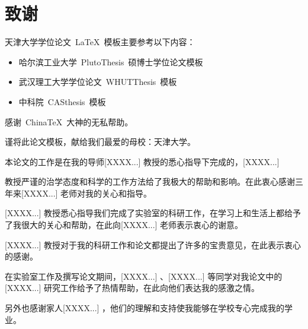 
\chapter*{致\quad 谢}

天津大学学位论文~\LaTeX~模板主要参考以下内容：
\begin{itemize}
  \item 哈尔滨工业大学~PlutoThesis~硕博士学位论文模板
  \item 武汉理工大学学位论文~WHUTThesis~模板
  \item 中科院~CASthesis~模板
\end{itemize}

感谢~ChinaTeX~大神的无私帮助。

谨将此论文模板，献给我们最爱的母校：天津大学。

\vspace*{1cm}
本论文的工作是在我的导师[XXXX...] 教授的悉心指导下完成的，[XXXX...]

教授严谨的治学态度和科学的工作方法给了我极大的帮助和影响。在此衷心感谢三年来[XXXX...] 老师对我的关心和指导。

[XXXX...] 教授悉心指导我们完成了实验室的科研工作，在学习上和生活上都给予了我很大的关心和帮助，在此向[XXXX...] 老师表示衷心的谢意。

[XXXX...] 教授对于我的科研工作和论文都提出了许多的宝贵意见，在此表示衷心的感谢。

在实验室工作及撰写论文期间，[XXXX...] 、[XXXX...] 等同学对我论文中的[XXXX...] 研究工作给予了热情帮助，在此向他们表达我的感激之情。

另外也感谢家人[XXXX...] ，他们的理解和支持使我能够在学校专心完成我的学业。



